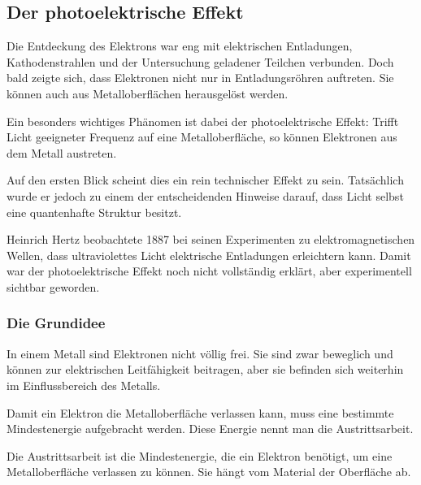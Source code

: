 \subsection{Der photoelektrische Effekt}
\label{sec:photoelektrischer-effekt}

Die Entdeckung des Elektrons war eng mit elektrischen Entladungen,
Kathodenstrahlen und der Untersuchung geladener Teilchen verbunden.
Doch bald zeigte sich, dass Elektronen nicht nur in Entladungsröhren
auftreten. Sie können auch aus Metalloberflächen herausgelöst werden.

Ein besonders wichtiges Phänomen ist dabei der photoelektrische Effekt:
Trifft Licht geeigneter Frequenz auf eine Metalloberfläche,
so können Elektronen aus dem Metall austreten.

Auf den ersten Blick scheint dies ein rein technischer Effekt zu sein.
Tatsächlich wurde er jedoch zu einem der entscheidenden Hinweise darauf,
dass Licht selbst eine quantenhafte Struktur besitzt.

\begin{HistoryBox}
	\label{box:hertz-photoeffekt}
	Heinrich Hertz beobachtete 1887 bei seinen Experimenten zu
	elektromagnetischen Wellen, dass ultraviolettes Licht
	elektrische Entladungen erleichtern kann. Damit war der photoelektrische Effekt
	noch nicht vollständig erklärt, aber experimentell sichtbar geworden.
\end{HistoryBox}

\subsubsection{Die Grundidee}

In einem Metall sind Elektronen nicht völlig frei.
Sie sind zwar beweglich und können zur elektrischen Leitfähigkeit beitragen,
aber sie befinden sich weiterhin im Einflussbereich des Metalls.

Damit ein Elektron die Metalloberfläche verlassen kann,
muss eine bestimmte Mindestenergie aufgebracht werden.
Diese Energie nennt man die Austrittsarbeit.

\begin{PhysicsBox}[Austrittsarbeit]
	\label{box:austrittsarbeit}
	Die Austrittsarbeit ist die Mindestenergie, die ein Elektron benötigt,
	um eine Metalloberfläche verlassen zu können.
	Sie hängt vom Material der Oberfläche ab.
\end{PhysicsBox}

